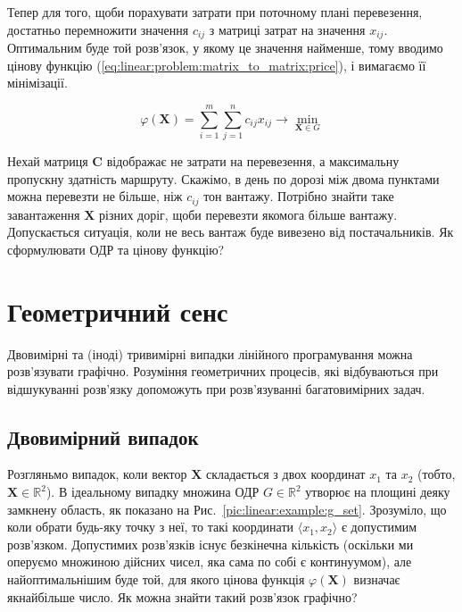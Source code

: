 \documentclass[\main/book.tex]{subfiles}
\begin{document}
Тепер для того, щоби порахувати затрати при поточному плані перевезення, достатньо перемножити значення $c_{ij}$ з матриці затрат на значення $x_{ij}$. Оптимальним буде той розв'язок, у якому це значення найменше, тому вводимо цінову функцію (\ref{eq:linear:problem:matrix_to_matrix:price}), і вимагаємо її мінімізації.

\begin{equation}
 \varphi(\mathbf{X}) =
 \sum_{i=1}^m \sum_{j=1}^n
 c_{ij} x_{ij}
 \rightarrow \min_{\mathbf{X} \in G}
 \label{eq:linear:problem:matrix_to_matrix:price}
\end{equation}

\begin{question}
 Нехай матриця $\mathbf{C}$ відображає не затрати на перевезення, а максимальну пропускну здатність маршруту. Скажімо, в день по дорозі між двома пунктами можна перевезти не більше, ніж $c_{ij}$ тон вантажу. Потрібно знайти таке завантаження $\mathbf{X}$ різних доріг, щоби перевезти якомога більше вантажу. Допускається ситуація, коли не весь вантаж буде вивезено від постачальників. Як сформулювати ОДР та цінову функцію?
\end{question}

\section{Геометричний сенс}
\label{section:linear:geometrical}

Двовимірні та (іноді) тривимірні випадки лінійного програмування можна розв'язувати графічно. Розуміння геометричних процесів, які відбуваються при відшукуванні розв'язку допоможуть при розв'язуванні багатовимірних задач.

\subsection{Двовимірний випадок}

Розгляньмо випадок, коли вектор $\mathbf{X}$ складається з двох координат $x_1$ та $x_2$ (тобто, ${\mathbf{X} \in \mathbb{R}^2}$). В ідеальному випадку множина ОДР ${G \in \mathbb{R}^2}$ утворює на площині деяку замкнену область, як показано на Рис.~\ref{pic:linear:example:g_set}. Зрозуміло, що коли обрати будь-яку точку з неї, то такі координати ${\langle x_1, x_2 \rangle}$ є допустимим розв'язком. Допустимих розв'язків існує безкінечна кількість (оскільки ми оперуємо множиною дійсних чисел, яка сама по собі є континуумом), але найоптимальнішим буде той, для якого цінова функція $\varphi(\mathbf{X})$ визначає якнайбільше число. Як можна знайти такий розв'язок графічно?
\end{document}
